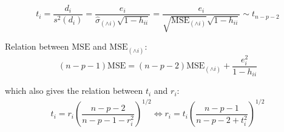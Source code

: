 \begin{itemize}[topsep=2pt,itemsep=2pt]
    \begin{equation}
         t_i=\dfrac{d_i}{s^2(d_i)}=\dfrac{e_i}{\hat{\sigma} _{(\wedge i)}\sqrt{1-h_{ii}}}= \dfrac{e_i}{\sqrt{\mathrm{MSE}_{(\wedge i)} }\sqrt{1-h_{ii}}}\sim t_{n-p-2}
    \end{equation}

    Relation between $ \mathrm{MSE}  $ and $ \mathrm{MSE}_{(\wedge i)}  $:
    \begin{equation}
        (n-p-1)\mathrm{MSE}=(n-p-2)\mathrm{MSE}_{(\wedge i)}+\dfrac{e_i^2}{1-h_{ii}}   
    \end{equation}

    which also gives the relation between $ t_i $ and $ r_i $:
    \begin{align*}
        t_i=r_i\left(\dfrac{n-p-2}{n-p-1-r_i^2}\right)^{1/2}\Leftrightarrow r_i=t_i\left(\dfrac{n-p-1}{n-p-2+t_i^2}\right)^{1/2} 
    \end{align*}
    
\end{itemize}


